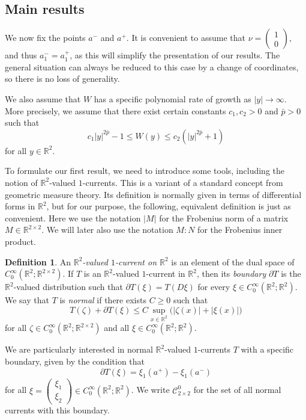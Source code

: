 \documentclass[a4paper]{article}
\newcommand{\R}{\mathbb{R}}
\newcommand{\ncrt}{\mathcal{C}}
\theoremstyle{definition}
\newtheorem{definition}[theorem]{Definition}
\theoremstyle{remark}
\begin{document}
\subsection{Main results}

We now fix the points $a^-$ and $a^+$. It is convenient to assume that
$\nu = (\begin{smallmatrix} 1 \\ 0 \end{smallmatrix})$, and thus $a_1^- = a_1^+$,
as this will simplify the presentation of our results. The general situation
can always be reduced to this case by a change of coordinates, so there is no
loss of generality.

We also assume that $W$ has a specific polynomial rate of growth as $|y| \to \infty$.
More precisely, we assume that there exist certain constants $c_1, c_2 > 0$
and $\bar{p} > 0$ such that
\begin{equation} \label{eq:growth-W}
c_1|y|^{2\bar{p}} - 1 \le W(y) \le c_2(|y|^{2\bar{p}} + 1)
\end{equation}
for all $y \in \R^2$.

To formulate our first result, we need to introduce some tools, including the notion
of $\R^2$-valued $1$-currents. This is a variant of a standard concept from geometric
measure theory. Its definition is normally given in terms of differential
forms in $\R^2$, but for our purpose, the following, equivalent definition is just as convenient.
Here we use the notation $|M|$ for the Frobenius norm of a matrix $M \in \R^{2 \times 2}$. We will later also use the notation $M :N$ for the Frobenius
inner product.

\begin{definition} \label{def:current-intro}
An \emph{$\R^2$-valued $1$-current on $\R^2$} is an element of the dual space of
$C_0^\infty(\R^2; \R^{2 \times 2})$. If $T$ is an $\R^2$-valued $1$-current in $\R^2$,
then its \emph{boundary} $\partial T$ is the
$\R^2$-valued distribution such that $\partial T(\xi) = T(D\xi)$
for every $\xi \in C_0^\infty(\R^2; \R^2)$. We say that $T$ is \emph{normal} if there
exists $C \ge 0$ such that
\[
T(\zeta) + \partial T(\xi) \le C\sup_{x \in \R^2} \bigl(|\zeta(x)| + |\xi(x)|\bigr)
\]
for all $\zeta \in C_0^\infty(\R^2; \R^{2 \times 2})$ and all $\xi \in C_0^\infty(\R^2; \R^2)$.
\end{definition}

We are particularly interested in normal $\R^2$-valued $1$-currents $T$ with a specific boundary,
given by the condition that
\[
\partial T(\xi) = \xi_1(a^+) - \xi_1(a^-)
\]
for all $\xi = (\begin{smallmatrix} \xi_1 \\ \xi_2 \end{smallmatrix})\in C_0^\infty(\R^2; \R^2)$. We write $\ncrt_{2 \times 2}^0$ for the set of
all normal currents with this boundary.
\end{document}
